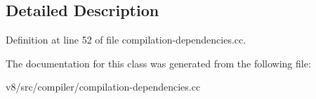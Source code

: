 \subsection{Detailed Description}


Definition at line 52 of file compilation-\/dependencies.\+cc.



The documentation for this class was generated from the following file\+:\begin{DoxyCompactItemize}
\item 
v8/src/compiler/compilation-\/dependencies.\+cc\end{DoxyCompactItemize}
